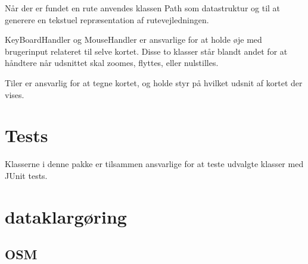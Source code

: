 Når der er fundet en rute anvendes klassen Path som datastruktur og til at generere en tekstuel repræsentation af rutevejledningen.

KeyBoardHandler og MouseHandler er ansvarlige for at holde øje med brugerinput relateret til selve kortet. Disse to klasser står blandt andet for at håndtere når udsnittet skal zoomes, flyttes, eller nulstilles.

Tiler er ansvarlig for at tegne kortet, og holde styr på hvilket udsnit af kortet der vises.

\section{Tests}
\label{sec:tests}

Klasserne i denne pakke er tilsammen ansvarlige for at teste udvalgte klasser med JUnit tests.

\section{dataklargøring}
\subsection{OSM}

